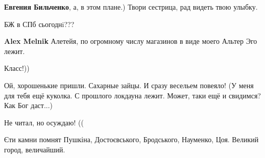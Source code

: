 \begin{itemize}
\begin{itemize}
\textbf{Евгения Бильченко}, а, в этом плане.) Твори сестрица, рад видеть твою улыбку.
\end{itemize} %

БЖ в СПб сьогоднi???

\begin{itemize} %
\textbf{Alex Melnik} Алетейя, по огромному числу магазинов в виде моего Альтер Эго лежит.
\end{itemize} %

Класс!))


Ой, хорошенькие пришли. Сахарные зайцы. И сразу весельем повеяло! (У меня для
тебя ещё куколка. С прошлого локдауна лежит. Может, таки ещё и свидимся? Как
Бог даст...)

Не читал, но осуждаю! ((

Єти камни помнят Пушкіна, Достоєвського, Бродського, Науменко, Цоя. Великий город, величайший.

\end{itemize} %

